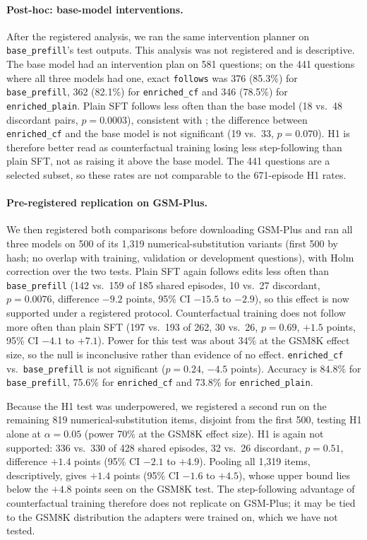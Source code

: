 \documentclass[11pt,a4paper]{article}
\begin{document}
\paragraph{Post-hoc: base-model interventions.} After the registered analysis, we ran the same intervention planner on \texttt{base\_prefill}'s test outputs. This analysis was not registered and is descriptive. The base model had an intervention plan on 581 questions; on the 441 questions where all three models had one, exact \texttt{follows} was 376 (85.3\%) for \texttt{base\_prefill}, 362 (82.1\%) for \texttt{enriched\_cf} and 346 (78.5\%) for \texttt{enriched\_plain}. Plain SFT follows less often than the base model (18 vs.\ 48 discordant pairs, $p = 0.0003$), consistent with \citet{lobo2024impact}; the difference between \texttt{enriched\_cf} and the base model is not significant (19 vs.\ 33, $p = 0.070$). H1 is therefore better read as counterfactual training losing less step-following than plain SFT, not as raising it above the base model. The 441 questions are a selected subset, so these rates are not comparable to the 671-episode H1 rates.

\paragraph{Pre-registered replication on GSM-Plus.} We then registered both comparisons before downloading GSM-Plus \citep{li2024gsmplus} and ran all three models on 500 of its 1,319 numerical-substitution variants (first 500 by hash; no overlap with training, validation or development questions), with Holm correction over the two tests. Plain SFT again follows edits less often than \texttt{base\_prefill} (142 vs.\ 159 of 185 shared episodes, 10 vs.\ 27 discordant, $p = 0.0076$, difference $-9.2$ points, 95\% CI $-15.5$ to $-2.9$), so this effect is now supported under a registered protocol. Counterfactual training does not follow more often than plain SFT (197 vs.\ 193 of 262, 30 vs.\ 26, $p = 0.69$, $+1.5$ points, 95\% CI $-4.1$ to $+7.1$). Power for this test was about 34\% at the GSM8K effect size, so the null is inconclusive rather than evidence of no effect. \texttt{enriched\_cf} vs.\ \texttt{base\_prefill} is not significant ($p = 0.24$, $-4.5$ points). Accuracy is 84.8\% for \texttt{base\_prefill}, 75.6\% for \texttt{enriched\_cf} and 73.8\% for \texttt{enriched\_plain}.

Because the H1 test was underpowered, we registered a second run on the remaining 819 numerical-substitution items, disjoint from the first 500, testing H1 alone at $\alpha = 0.05$ (power 70\% at the GSM8K effect size). H1 is again not supported: 336 vs.\ 330 of 428 shared episodes, 32 vs.\ 26 discordant, $p = 0.51$, difference $+1.4$ points (95\% CI $-2.1$ to $+4.9$). Pooling all 1,319 items, descriptively, gives $+1.4$ points (95\% CI $-1.6$ to $+4.5$), whose upper bound lies below the $+4.8$ points seen on the GSM8K test. The step-following advantage of counterfactual training therefore does not replicate on GSM-Plus; it may be tied to the GSM8K distribution the adapters were trained on, which we have not tested.
\end{document}
